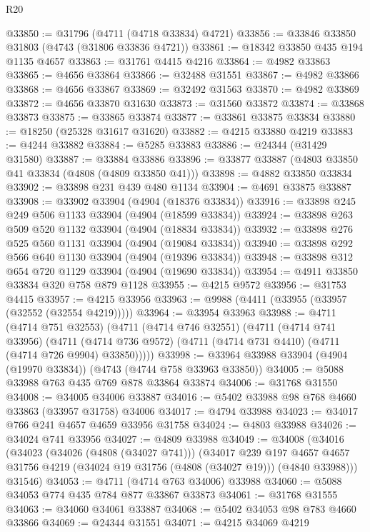 \begin{lexlean}{R20}
\begin{coremodule}
@33850 := @31796 (@4711 (@4718 @33834) @4721)
@33856 := @33846 @33850 @31803 (@4743 (@31806 @33836 @4721))
@33861 := @18342 @33850 @435 @194 @1135 @4657
@33863 := @31761 @4415 @4216
@33864 := @4982 @33863
@33865 := @4656 @33864
@33866 := @32488 @31551
@33867 := @4982 @33866
@33868 := @4656 @33867
@33869 := @32492 @31563
@33870 := @4982 @33869
@33872 := @4656 @33870 @31630
@33873 := @31560 @33872
@33874 := @33868 @33873
@33875 := @33865 @33874
@33877 := @33861 @33875 @33834
@33880 := @18250 (@25328 @31617 @31620)
@33882 := @4215 @33880 @4219
@33883 := @4244 @33882
@33884 := @5285 @33883
@33886 := @24344 (@31429 @31580)
@33887 := @33884 @33886
@33896 := @33877 @33887 (@4803 @33850 @41 @33834 (@4808 (@4809 @33850 @41)))
@33898 := @4882 @33850 @33834
@33902 := @33898 @231 @439 @480 @1134
@33904 := @4691 @33875 @33887
@33908 := @33902 @33904 (@4904 (@18376 @33834))
@33916 := @33898 @245 @249 @506 @1133 @33904 (@4904 (@18599 @33834))
@33924 := @33898 @263 @509 @520 @1132 @33904 (@4904 (@18834 @33834))
@33932 := @33898 @276 @525 @560 @1131 @33904 (@4904 (@19084 @33834))
@33940 := @33898 @292 @566 @640 @1130 @33904 (@4904 (@19396 @33834))
@33948 := @33898 @312 @654 @720 @1129 @33904 (@4904 (@19690 @33834))
@33954 := @4911 @33850 @33834 @320 @758 @879 @1128
@33955 := @4215 @9572
@33956 := @31753 @4415
@33957 := @4215 @33956
@33963 := @9988 (@4411 (@33955 (@33957 (@32552 (@32554 @4219)))))
@33964 := @33954 @33963
@33988 := @4711
    (@4714 @751 @32553)
    (@4711
      (@4714 @746 @32551)
      (@4711
        (@4714 @741 @33956)
        (@4711 (@4714 @736 @9572) (@4711 (@4714 @731 @4410) (@4711 (@4714 @726 @9904) @33850)))))
@33998 := @33964 @33988 @33904 (@4904 (@19970 @33834)) (@4743 (@4744 @758 @33963 @33850))
@34005 := @5088 @33988 @763 @435 @769 @878 @33864 @33874
@34006 := @31768 @31550
@34008 := @34005 @34006 @33887
@34016 := @5402 @33988 @98 @768 @4660 @33863 (@33957 @31758) @34006
@34017 := @4794 @33988
@34023 := @34017 @766 @241 @4657 @4659 @33956 @31758
@34024 := @4803 @33988
@34026 := @34024 @741 @33956
@34027 := @4809 @33988
@34049 := @34008
    (@34016
      (@34023
        (@34026 (@4808 (@34027 @741)))
        (@34017
          @239
          @197
          @4657
          @4657
          @31756
          @4219
          (@34024 @19 @31756 (@4808 (@34027 @19)))
          (@4840 @33988)))
      @31546)
@34053 := @4711 (@4714 @763 @34006) @33988
@34060 := @5088 @34053 @774 @435 @784 @877 @33867 @33873
@34061 := @31768 @31555
@34063 := @34060 @34061 @33887
@34068 := @5402 @34053 @98 @783 @4660 @33866
@34069 := @24344 @31551
@34071 := @4215 @34069 @4219

\end{coremodule}
\end{lexlean}
